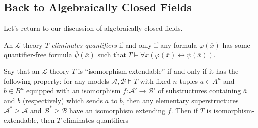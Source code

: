 \documentclass[../notes.tex]{subfiles}
\begin{document}
\subsection{Back to Algebraically Closed Fields}
Let's return to our discussion of algebraically closed fields.
\begin{definition}
	An $\mathcal L$-theory $T$ \textit{eliminates quantifiers} if and only if any formula $\varphi(\overline x)$ has some quantifier-free formula $\overline\psi(\overline x)$ such that $T\models\forall x(\varphi(\overline x)\leftrightarrow\psi(\overline x))$.
\end{definition}
\begin{theorem} \label{thm:get-elim-quant}
	Say that an $\mathcal L$-theory $T$ is ``isomorphism-extendable'' if and only if it has the following property: for any models $\mathcal A,\mathcal B\models T$ with fixed $n$-tuples $a\in A^n$ and $b\in B^n$ equipped with an isomorphism $f\colon\mathcal A'\to\mathcal B'$ of substructures containing $\overline a$ and $\overline b$ (respectively) which sends $\overline a$ to $\overline b$, then any elementary superstructures $\mathcal A^*\ge\mathcal A$ and $\mathcal B^*\ge\mathcal B$ have an isomorphism extending $f$. Then if $T$ is isomorphism-extendable, then $T$ eliminates quantifiers.
\end{theorem}
\end{document}
